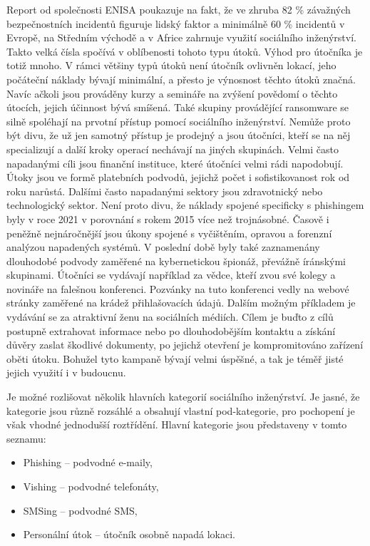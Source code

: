 Report od společnosti \ac{ENISA} poukazuje na fakt, že ve zhruba 82 \% závažných bezpečnostních incidentů figuruje lidský faktor a minimálně 60 \% incidentů v Evropě, na Středním východě a v Africe zahrnuje využití sociálního inženýrství.
Takto velká čísla spočívá v oblíbenosti tohoto typu útoků.
Výhod pro útočníka je totiž mnoho.
V rámci většiny typů útoků není útočník ovlivněn lokací, jeho počáteční náklady bývají minimální, a přesto je výnosnost těchto útoků značná.
Navíc ačkoli jsou prováděny kurzy a semináře na zvýšení povědomí o těchto útocích, jejich účinnost bývá smíšená.
Také skupiny provádějící ransomware se silně spoléhají na prvotní přístup pomocí sociálního inženýrství.
Nemůže proto být divu, že už jen samotný přístup je prodejný a jsou útočníci, kteří se na něj specializují a další kroky operací nechávají na jiných skupinách.
Velmi často napadanými cíli jsou finanční instituce, které útočníci velmi rádi napodobují.
Útoky jsou ve formě platebních podvodů, jejichž počet i sofistikovanost rok od roku narůstá.
Dalšími často napadanými sektory jsou zdravotnický nebo technologický sektor.
Není proto divu, že náklady spojené specificky s phishingem byly v roce 2021 v porovnání s rokem 2015 více než trojnásobné.
Časově i peněžně nejnáročnější jsou úkony spojené s vyčištěním, opravou a forenzní analýzou napadených systémů.
V poslední době byly také zaznamenány dlouhodobé podvody zaměřené na kybernetickou špionáž, převážně íránskými skupinami.
Útočníci se vydávají například za vědce, kteří zvou své kolegy a novináře na falešnou konferenci.
Pozvánky na tuto konferenci vedly na webové stránky zaměřené na krádež přihlašovacích údajů.
Dalším možným příkladem je vydávání se za atraktivní ženu na sociálních médiích.
Cílem je buďto z cílů postupně extrahovat informace nebo po dlouhodobějším kontaktu a získání důvěry zaslat škodlivé dokumenty, po jejichž otevření je kompromitováno zařízení oběti útoku.
Bohužel tyto kampaně bývají velmi úspěšné, a tak je téměř jisté jejich využití i v budoucnu.\cite{Enisa_thread_landscape}

Je možné rozlišovat několik hlavních kategorií sociálního inženýrství.
Je jasné, že kategorie jsou různě rozsáhlé a obsahují vlastní pod-kategorie, pro pochopení je však vhodné jednodušší roztřídění.
Hlavní kategorie jsou představeny v tomto seznamu\cite{Enisa_thread_landscape, moje_bakalarka}:
\begin{itemize}
	\item Phishing -- podvodné e-maily,
	\item Vishing -- podvodné telefonáty,
	\item SMSing -- podvodné \ac{SMS},
	\item Personální útok -- útočník osobně napadá lokaci.
\end{itemize}


